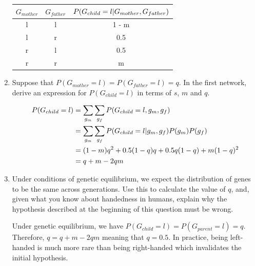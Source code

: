 \documentclass[11pt, a4paper]{article}
\begin{document}
\begin{enumerate}
\begin{solution}
        \begin{center}
            \begin{tabular}{cc|c}
                \toprule
                 $G_{mother}$ & $G_{father}$ & $P(G_{child} = l \vert G_{mother}, G_{father})$ \\
                 \midrule
                 l & l & 1 - m \\
                 l & r & 0.5 \\
                 r & l & 0.5 \\
                 r & r & m \\
                \bottomrule
            \end{tabular}
        \end{center}
        
        \vspace{1ex}
    \end{solution}
    
    \item Suppose that $P(G_{mother} = l) = P(G_{father} = l) = q$. In the first network, derive an expression for $P(G_{child} = l)$ in terms of $s$, $m$ and $q$.
    \begin{solution}
        \begin{align*}
            P(G_{child} = l) & = \sum_{g_m} \sum_{g_f} P(G_{child} = l, g_m, g_f) \\
            & = \sum_{g_m} \sum_{g_f} P(G_{child} = l \vert g_m, g_f) P(g_m) P(g_f) \\
            & = (1 - m) q^2 + 0.5 (1 - q) q + 0.5 q (1 - q) + m (1 - q)^2 \\
            & = q + m - 2qm
        \end{align*}
    \end{solution}
    
    \item Under conditions of genetic equilibrium, we expect the distribution of genes to be the same across generations. Use this to calculate the value of $q$, and, given what you know about handedness in humans, explain why the hypothesis described at the beginning of this question must be wrong.
    
    \begin{solution}
        Under genetic equilibrium, we have $P(G_{child} = l) = P(G_{parent} = l) = q$. Therefore, $q = q + m - 2 q m$ meaning that $q = 0.5$. In practice, being left-handed is much more rare than being right-handed which invalidates the initial hypothesis.
    \end{solution}    
\end{enumerate}
\end{document}
